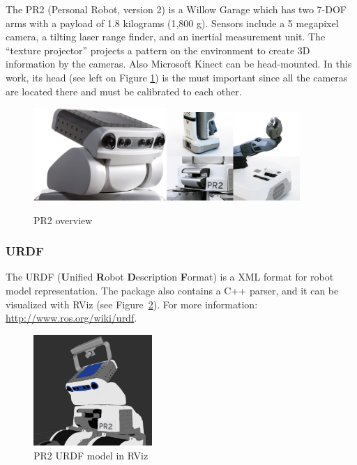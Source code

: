 The PR2 (Personal Robot, version 2) is a Willow Garage which has two 7-DOF arms with a payload of 1.8 kilograms (1,800 g). Sensors include a 5 megapixel camera, a tilting laser range finder, and an inertial measurement unit. The ``texture projector'' projects a pattern on the environment to create 3D information by the cameras. Also Microsoft Kinect can be head-mounted. In this work, its head (see left on Figure \ref{fig:pr2}) is the must important since all the cameras are located there and must be calibrated to each other.
\begin{figure}[!htbp]
 \centering
 \includegraphics[width=0.45\textwidth]{images/PR2_01.jpg}\includegraphics[width=0.45\textwidth]{images/PR2_joint.jpg}
 \caption{PR2 overview}
 \label{fig:pr2}
\end{figure}

\vspace*{-1ex}
\subsubsection{URDF}
\label{sec:urdf}

The URDF (\textbf{U}nified \textbf{R}obot \textbf{D}escription \textbf{F}ormat) is a XML format for robot model representation. The package also contains a C++ parser, and it can be visualized with RViz (see Figure~\ref{fig:pr2_urdf}).
For more information: \url{http://www.ros.org/wiki/urdf}.
\begin{figure}[!htbp]
 \centering
 \includegraphics[width=0.4\textwidth]{images/screenshots/PR2_urdf.png}
 \caption{PR2 URDF model in RViz}
 \label{fig:pr2_urdf}
\end{figure}


